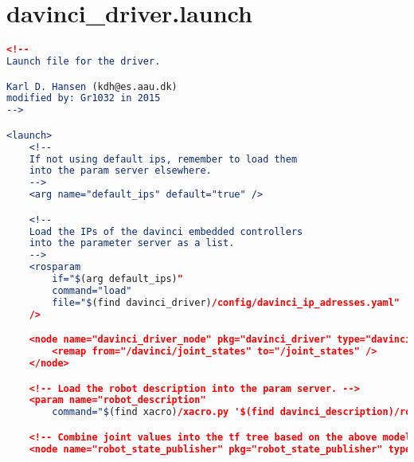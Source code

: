 \section*{davinci\_driver.launch}
\begin{lstlisting}[language=cmake]
<!--
Launch file for the driver.

Karl D. Hansen (kdh@es.aau.dk)
modified by: Gr1032 in 2015
-->

<launch>
    <!--
    If not using default ips, remember to load them
    into the param server elsewhere.
    -->
    <arg name="default_ips" default="true" />

    <!--
    Load the IPs of the davinci embedded controllers
    into the parameter server as a list.
    -->
    <rosparam
        if="$(arg default_ips)"
        command="load"
        file="$(find davinci_driver)/config/davinci_ip_adresses.yaml"
    />

    <node name="davinci_driver_node" pkg="davinci_driver" type="davinci_driver_node" output="screen" ns="davinci">
        <remap from="/davinci/joint_states" to="/joint_states" />
    </node>

    <!-- Load the robot description into the param server. -->
    <param name="robot_description"
        command="$(find xacro)/xacro.py '$(find davinci_description)/robots/davinci_description.xacro'" />

    <!-- Combine joint values into the tf tree based on the above model. -->
    <node name="robot_state_publisher" pkg="robot_state_publisher" type="state_publisher" />


\end{lstlisting}
